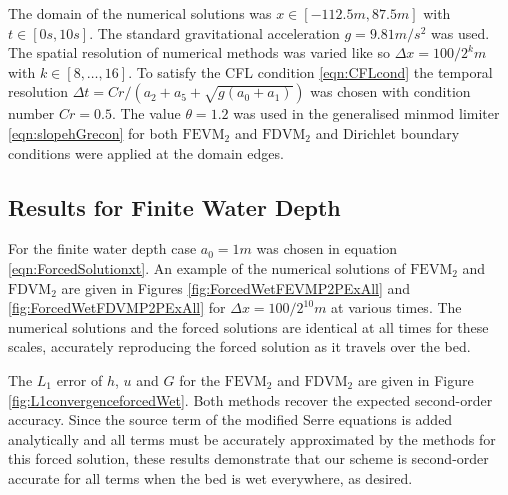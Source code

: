 The domain of the numerical solutions was $x \in \left[-112.5 m,87.5 m\right]$ with $t \in \left[0s,10s\right]$. The standard gravitational acceleration $g= 9.81 m/s^2$ was used. The spatial resolution of numerical methods was varied like so $\Delta x = 100 / 2^k m$ with $k \in \left[8,\dots,16\right]$. To satisfy the CFL condition \eqref{eqn:CFLcond} the temporal resolution
$\Delta t = Cr / \left(a_2 + a_5 + \sqrt{g\left(a_0 + a_1\right)}\right)$ was chosen with condition number $Cr = 0.5$. The value $\theta = 1.2$ was used in the generalised minmod limiter \eqref{eqn:slopehGrecon} for both $\text{FEVM}_2$ and $\text{FDVM}_2$ and Dirichlet boundary conditions were applied at the domain edges. 


\subsection{Results for Finite Water Depth} 
For the finite water depth case $a_0 = 1m$ was chosen in equation \eqref{eqn:ForcedSolutionxt}. An example of the numerical solutions of $\text{FEVM}_2$ and $\text{FDVM}_2$ are given in Figures \ref{fig:ForcedWetFEVMP2PExAll} and \ref{fig:ForcedWetFDVMP2PExAll} for $\Delta x = 100/ 2^{10} m$ at various times. The numerical solutions and the forced solutions are identical at all times for these scales, accurately reproducing the forced solution as it travels over the bed.

The $L_1$ error of $h$, $u$ and $G$ for the $\text{FEVM}_2$ and $\text{FDVM}_2$ are given in Figure \ref{fig:L1convergenceforcedWet}. Both methods recover the expected second-order accuracy. Since the source term of the modified Serre equations is added analytically and all terms must be accurately approximated by the methods for this forced solution, these results demonstrate that our scheme is second-order accurate for all terms when the bed is wet everywhere, as desired.

